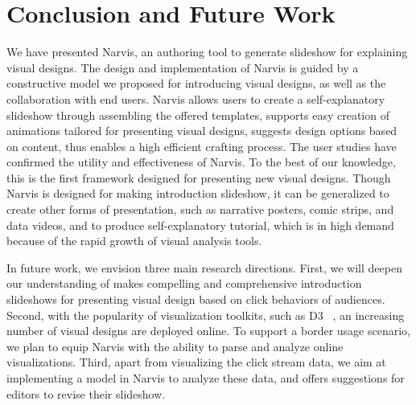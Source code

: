 \section{Conclusion and Future Work}
We have presented Narvis, an authoring tool to generate slideshow for explaining visual designs. 
The design and implementation of Narvis is guided by a constructive model we proposed for introducing visual designs, as well as the collaboration with end users. 
Narvis allows users to create a self-explanatory slideshow through assembling the offered templates, supports easy creation of animations tailored for presenting visual designs, suggests design options based on content, thus enables a high efficient crafting process.
The user studies have confirmed the utility and effectiveness of Narvis. To the best of our knowledge, this is the first framework designed for presenting new visual designs. Though Narvis is designed for making introduction slideshow, it can be generalized to create other forms of presentation, such as narrative posters, comic strips, and data videos, and to produce self-explanatory tutorial, which is in high demand because of the rapid growth of visual analysis tools.

In future work, we envision three main research directions. 
First, we will deepen our understanding of makes compelling and comprehensive introduction slideshows for presenting visual design based on click behaviors of audiences. 
Second, with the popularity of visualization toolkits, such as D3 ~\cite{bostock2011d3}, an increasing number of visual designs are deployed online. To support a border usage scenario, we plan to equip Narvis with the ability to parse and analyze online visualizations. 
Third, apart from visualizing the click stream data, we aim at implementing a model in Narvis to analyze these data, and offers suggestions for editors to revise their slideshow.  
